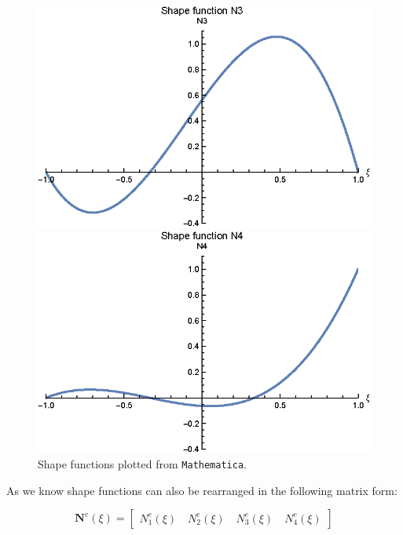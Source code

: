 \begin{figure}[H]
\begin{minipage}[b]{0.45\textwidth}
    \end{minipage}
    \begin{minipage}[b]{0.45\textwidth}
        \centering
        \includegraphics[width=\textwidth]{pdf/shape_function_N3}
    \end{minipage}
    \hfill
    \begin{minipage}[b]{0.45\textwidth}
        \centering
        \includegraphics[width=\textwidth]{pdf/shape_function_N4}
    \end{minipage}
    \caption{Shape functions plotted from \texttt{Mathematica}.}
    \label{fig:shape_functions}
\end{figure}

As we know shape functions can also be rearranged in the following matrix form:

\begin{equation}
    \mathbf{N}^e(\xi) = \begin{bmatrix}
        N_1^e(\xi) \quad N_2^e(\xi) \quad N_3^e(\xi) \quad N_4^e(\xi)
    \end{bmatrix}
\end{equation}

